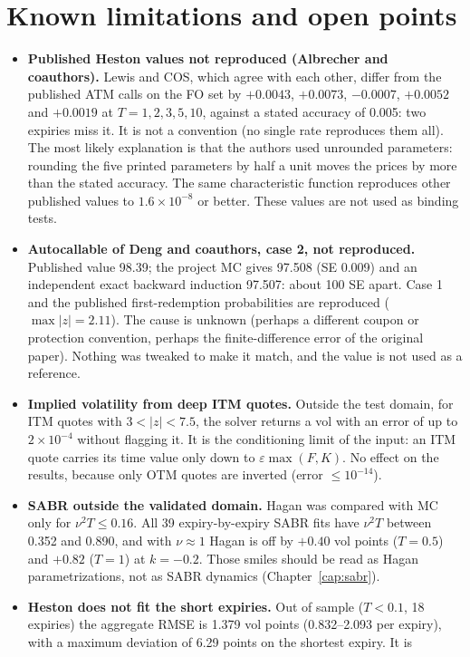 \section{Known limitations and open points}
\label{sec:val-limiti}
\begin{itemize}
\item \textbf{Published Heston values not reproduced (Albrecher and coauthors).} Lewis and COS, which agree with each
other, differ from the published ATM calls on the FO set by $+0.0043$, $+0.0073$, $-0.0007$, $+0.0052$ and $+0.0019$
at $T=1,2,3,5,10$, against a stated accuracy of 0.005: two expiries miss it. It is not a convention (no single rate
reproduces them all). The most likely explanation is that the authors used unrounded parameters: rounding the five
printed parameters by half a unit moves the prices by more than the stated accuracy. The same characteristic function
reproduces other published values to $1.6\times10^{-8}$ or better. These values are not used as binding tests.
\item \textbf{Autocallable of Deng and coauthors, case 2, not reproduced.} Published value 98.39; the project MC gives
97.508 (SE 0.009) and an independent exact backward induction 97.507: about 100 SE apart. Case 1 and the published
first-redemption probabilities are reproduced ($\max|z|=2.11$). The cause is unknown (perhaps a different coupon or
protection convention, perhaps the finite-difference error of the original paper). Nothing was tweaked to make it
match, and the value is not used as a reference.
\item \textbf{Implied volatility from deep ITM quotes.} Outside the test domain, for ITM quotes with $3<|z|<7.5$, the
solver returns a vol with an error of up to $2\times10^{-4}$ without flagging it. It is the conditioning limit of the
input: an ITM quote carries its time value only down to $\varepsilon\max(F,K)$. No effect on the results, because only
OTM quotes are inverted (error $\le10^{-14}$).
\item \textbf{SABR outside the validated domain.} Hagan was compared with MC only for $\nu^2T\le0.16$. All 39
expiry-by-expiry SABR fits have $\nu^2T$ between 0.352 and 0.890, and with $\nu\approx1$ Hagan is off by $+0.40$ vol
points ($T=0.5$) and $+0.82$ ($T=1$) at $k=-0.2$. Those smiles should be read as Hagan parametrizations, not as SABR
dynamics (Chapter~\ref{cap:sabr}).
\item \textbf{Heston does not fit the short expiries.} Out of sample ($T<0.1$, 18 expiries) the aggregate RMSE is
1.379 vol points (0.832--2.093 per expiry), with a maximum deviation of 6.29 points on the shortest expiry. It is

\end{itemize}
